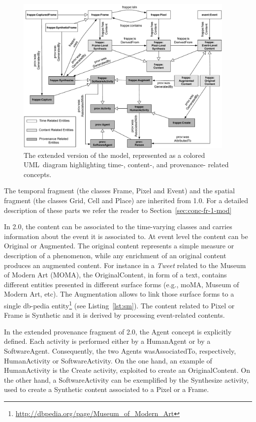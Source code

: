 \begin{figure}[t]
\centering
\includegraphics[width=0.95\textwidth]{img/conceptual-model-extended-core}
\caption{The extended version of the \frappe{} model, represented as a colored UML\ diagram highlighting time-, content-, and provenance- related concepts.}
\label{fig:extended-core}
\end{figure} 

The temporal fragment (the classes \textsf{Frame}, \textsf{Pixel} and \textsf{Event}) and the spatial fragment (the classes \textsf{Grid}, \textsf{Cell} and \textsf{Place}) are inherited from \frappe{} 1.0.
For a detailed description of these parts we refer the reader to Section~\ref{sec:conc-fr-1-mod}

In \frappe{} 2.0, the content can be associated to the time-varying classes and carries information about the event it is associated to.
At event level the content can be \textsf{Original} or \textsf{Augmented}. The original content represents a simple measure or description of a phenomenon, while any enrichment of an original content produces an augmented content.
For instance in a \textit{Tweet} related to the Museum of Modern Art (MOMA),  the \textsf{OriginalContent}, in form of a text, contains different entities presented in different surface forms (e.g., moMA, Museum of Modern Art, etc). The \textsf{Augmentation} allows to link those surface forms to a single db-pedia entity\footnote{\url{http://dbpedia.org/page/Museum_of_Modern_Art}} (see Listing~\ref{lst:sm}).
The content related to \textsf{Pixel} or \textsf{Frame} is \textsf{Synthetic} and it is derived by processing event-related contents. 

In the extended provenance fragment of \frappe{} 2.0, the \textsf{Agent} concept is explicitly defined.
Each activity is performed either by a \textsf{HumanAgent} or by a \textsf{SoftwareAgent}. Consequently, the two \textsf{Agent}s \textsf{wasAssociatedTo}, respectively, \textsf{HumanActivity} or \textsf{SoftwareActivity}. 
On the one hand, an example of \textsf{HumanActivity} is the \textsf{Create} activity, exploited to create an \textsf{OriginalContent}. On the other hand, a \textsf{SoftwareActivity} can be exemplified by the \textsf{Synthesize} activity, used to create a \textsf{Synthetic} content associated to a \textsf{Pixel} or a \textsf{Frame}.


